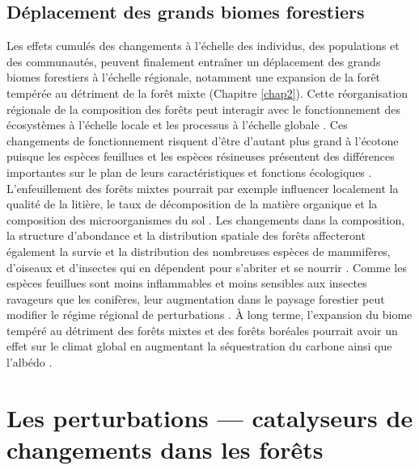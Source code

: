 \hypertarget{duxe9placement-des-grands-biomes-forestiers}{%
\subsection{Déplacement des grands biomes
forestiers}\label{duxe9placement-des-grands-biomes-forestiers}}

Les effets cumulés des changements à l'échelle des individus, des
populations et des communautés, peuvent finalement entraîner un
déplacement des grands biomes forestiers à l'échelle régionale,
notamment une expansion de la forêt tempérée au détriment de la forêt
mixte (Chapitre \ref{chap2}). Cette réorganisation régionale de la
composition des forêts peut interagir avec le fonctionnement des
écosystèmes à l'échelle locale et les processus à l'échelle globale
\citep[\emph{cross-scale interaction};][]{peters_crossscale_2007}. Ces
changements de fonctionnement risquent d'être d'autant plus grand à
l'écotone puisque les espèces feuillues et les espèces résineuses
présentent des différences importantes sur le plan de leurs
caractéristiques et fonctions écologiques
\citep{wardle_terrestrial_2011}. L'enfeuillement des forêts mixtes
pourrait par exemple influencer localement la qualité de la litière, le
taux de décomposition de la matière organique et la composition des
microorganismes du sol
\citep{laganiere_how_2010, legare_influence_2005}. Les changements dans
la composition, la structure d'abondance et la distribution spatiale des
forêts affecteront également la survie et la distribution des nombreuses
espèces de mammifères, d'oiseaux et d'insectes qui en dépendent pour
s'abriter et se nourrir \citep{friggens_effects_2018}. Comme les espèces
feuillues sont moins inflammables et moins sensibles aux insectes
ravageurs que les conifères, leur augmentation dans le paysage forestier
peut modifier le régime régional de perturbations
\citep{terrier_potential_2013, mffp_insectes_2018}. À long terme,
l'expansion du biome tempéré au détriment des forêts mixtes et des
forêts boréales pourrait avoir un effet sur le climat global en
augmentant la séquestration du carbone \citep{thurner_carbon_2014} ainsi
que l'albédo \citep{anderson_biophysical_2011}.

\hypertarget{les-perturbations-catalyseurs-de-changements-dans-les-foruxeats}{%
\section{Les perturbations --- catalyseurs de changements dans les
forêts}\label{les-perturbations-catalyseurs-de-changements-dans-les-foruxeats}}

